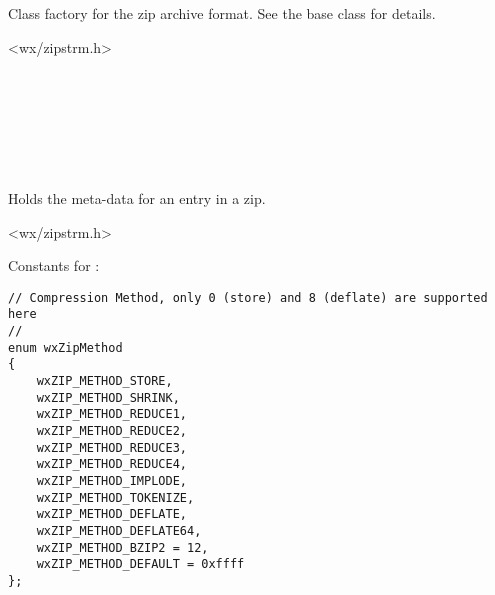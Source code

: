 %
%

\section{}\label{wxzipclassfactory}

Class factory for the zip archive format. See the base class
for details.




<wx/zipstrm.h>


\\
\\
\\
\\


%
%

\section{}\label{wxzipentry}

Holds the meta-data for an entry in a zip.




<wx/zipstrm.h>


Constants for :

\begin{verbatim}
// Compression Method, only 0 (store) and 8 (deflate) are supported here
//
enum wxZipMethod
{
    wxZIP_METHOD_STORE,
    wxZIP_METHOD_SHRINK,
    wxZIP_METHOD_REDUCE1,
    wxZIP_METHOD_REDUCE2,
    wxZIP_METHOD_REDUCE3,
    wxZIP_METHOD_REDUCE4,
    wxZIP_METHOD_IMPLODE,
    wxZIP_METHOD_TOKENIZE,
    wxZIP_METHOD_DEFLATE,
    wxZIP_METHOD_DEFLATE64,
    wxZIP_METHOD_BZIP2 = 12,
    wxZIP_METHOD_DEFAULT = 0xffff
};

\end{verbatim}

